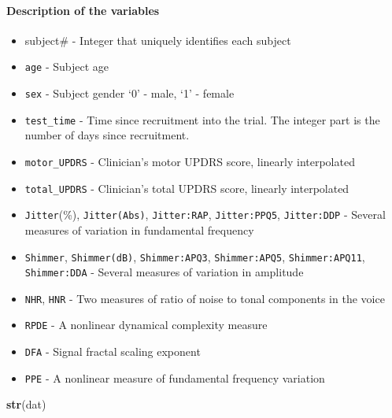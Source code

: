 \documentclass[
]{article}
\newenvironment{Shaded}{\begin{snugshade}}{\end{snugshade}}
\newcommand{\FunctionTok}[1]{\textcolor[rgb]{0.13,0.29,0.53}{\textbf{#1}}}
\newcommand{\NormalTok}[1]{#1}
\providecommand{\tightlist}{%
  \setlength{\itemsep}{0pt}\setlength{\parskip}{0pt}}
\begin{document}
\hypertarget{description-of-the-variables}{%
\paragraph{Description of the
variables}\label{description-of-the-variables}}

\begin{itemize}
\tightlist
\item
  subject\# - Integer that uniquely identifies each subject
\item
  \texttt{age} - Subject age
\item
  \texttt{sex} - Subject gender `0' - male, `1' - female
\item
  \texttt{test\_time} - Time since recruitment into the trial. The
  integer part is the number of days since recruitment.
\item
  \texttt{motor\_UPDRS} - Clinician's motor UPDRS score, linearly
  interpolated
\item
  \texttt{total\_UPDRS} - Clinician's total UPDRS score, linearly
  interpolated
\item
  \texttt{Jitter}(\%), \texttt{Jitter(Abs)}, \texttt{Jitter:RAP},
  \texttt{Jitter:PPQ5}, \texttt{Jitter:DDP} - Several measures of
  variation in fundamental frequency
\item
  \texttt{Shimmer}, \texttt{Shimmer(dB)}, \texttt{Shimmer:APQ3},
  \texttt{Shimmer:APQ5}, \texttt{Shimmer:APQ11}, \texttt{Shimmer:DDA} -
  Several measures of variation in amplitude
\item
  \texttt{NHR}, \texttt{HNR} - Two measures of ratio of noise to tonal
  components in the voice
\item
  \texttt{RPDE} - A nonlinear dynamical complexity measure
\item
  \texttt{DFA} - Signal fractal scaling exponent
\item
  \texttt{PPE} - A nonlinear measure of fundamental frequency variation
\end{itemize}

\begin{Shaded}
\begin{Highlighting}[]
\FunctionTok{str}\NormalTok{(dat)}
\end{Highlighting}
\end{Shaded}
\end{document}
